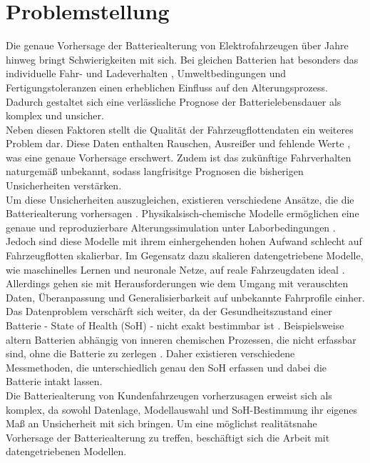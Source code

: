 \section{Problemstellung}
Die genaue Vorhersage der Batteriealterung von Elektrofahrzeugen über Jahre hinweg bringt Schwierigkeiten mit sich. Bei gleichen Batterien hat besonders das individuelle Fahr- \cite{urlIdBatterieAlterungVerschiedenerLithiumBatterien} und Ladeverhalten \cite{urlIdBatterieAlterungVerschiedenerSoCLithiumBatterien}, Umweltbedingungen \cite{urlIdBatterieAlterungTemperatur} und Fertigungstoleranzen einen erheblichen Einfluss auf den Alterungsprozess. Dadurch gestaltet sich eine verlässliche Prognose der Batterielebensdauer als komplex und unsicher.
\\
Neben diesen Faktoren stellt die Qualität der Fahrzeugflottendaten ein weiteres Problem dar. Diese Daten enthalten Rauschen, Ausreißer und fehlende Werte \cite{idEigeneFlottenDaten}, was eine genaue Vorhersage erschwert. Zudem ist das zukünftige Fahrverhalten naturgemäß unbekannt, sodass langfrisitge Prognosen die bisherigen Unsicherheiten verstärken.
\\
Um diese Unsicherheiten auszugleichen, existieren verschiedene Ansätze, die die Batteriealterung vorhersagen \cite{urlIdDifferentAgingMethodsForLIBs}. Physikalsisch-chemische Modelle ermöglichen eine genaue und reproduzierbare Alterungssimulation unter Laborbedingungen \cite{urlIdPhysicalAgingMethodsForLIBs}. Jedoch sind diese Modelle mit ihrem einhergehenden hohen Aufwand schlecht auf Fahrzeugflotten skalierbar. Im Gegensatz dazu skalieren datengetriebene Modelle, wie maschinelles Lernen und neuronale Netze, auf reale Fahrzeugdaten ideal \cite{urlIdDataAgingMethodsForLIBs}. Allerdings gehen sie mit Herausforderungen wie dem Umgang mit verauschten Daten, Überanpassung und Generalisierbarkeit auf unbekannte Fahrprofile einher.
Das Datenproblem verschärft sich weiter, da der Gesundheitszustand einer Batterie - State of Health (SoH) - nicht exakt bestimmbar ist \cite{urlIdSoCSoHDependencyLIBs}. Beispielsweise altern Batterien abhängig von inneren chemischen Prozessen, die nicht erfassbar sind, ohne die Batterie zu zerlegen \cite{urlIdBatterieAlterungVerschiedenerSoCLithiumBatterien}. Daher existieren verschiedene Messmethoden, die unterschiedlich genau den SoH erfassen und dabei die Batterie intakt lassen.
\\
Die Batteriealterung von Kundenfahrzeugen vorherzusagen erweist sich als komplex, da sowohl Datenlage, Modellauswahl und SoH-Bestimmung ihr eigenes Maß an Unsicherheit mit sich bringen. Um eine möglichst realitätsnahe Vorhersage der Batteriealterung zu treffen, beschäftigt sich die Arbeit mit datengetriebenen Modellen.

